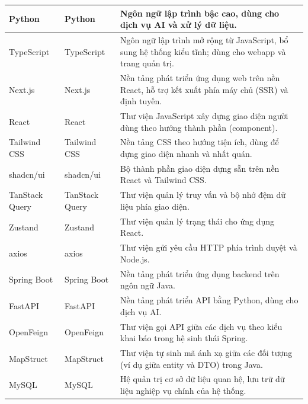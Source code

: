 \begin{longtable}{|L{0.18\textwidth}|L{0.27\textwidth}|L{0.49\textwidth}|}
Python & Python & Ngôn ngữ lập trình bậc cao, dùng cho dịch vụ AI và xử lý dữ liệu. \\
\hline

TypeScript & TypeScript & Ngôn ngữ lập trình mở rộng từ JavaScript, bổ sung hệ thống kiểu tĩnh; dùng cho webapp và trang quản trị. \\
\hline

Next.js & Next.js & Nền tảng phát triển ứng dụng web trên nền React, hỗ trợ kết xuất phía máy chủ (SSR) và định tuyến. \\
\hline

React & React & Thư viện JavaScript xây dựng giao diện người dùng theo hướng thành phần (component). \\
\hline

Tailwind CSS & Tailwind CSS & Nền tảng CSS theo hướng tiện ích, dùng để dựng giao diện nhanh và nhất quán. \\
\hline

shadcn/ui & shadcn/ui & Bộ thành phần giao diện dựng sẵn trên nền React và Tailwind CSS. \\
\hline

TanStack Query & TanStack Query & Thư viện quản lý truy vấn và bộ nhớ đệm dữ liệu phía giao diện. \\
\hline

Zustand & Zustand & Thư viện quản lý trạng thái cho ứng dụng React. \\
\hline

axios & axios & Thư viện gửi yêu cầu HTTP phía trình duyệt và Node.js. \\
\hline

Spring Boot & Spring Boot & Nền tảng phát triển ứng dụng backend trên ngôn ngữ Java. \\
\hline

FastAPI & FastAPI & Nền tảng phát triển API bằng Python, dùng cho dịch vụ AI. \\
\hline

OpenFeign & OpenFeign & Thư viện gọi API giữa các dịch vụ theo kiểu khai báo trong hệ sinh thái Spring. \\
\hline

MapStruct & MapStruct & Thư viện tự sinh mã ánh xạ giữa các đối tượng (ví dụ giữa entity và DTO) trong Java. \\
\hline

MySQL & MySQL & Hệ quản trị cơ sở dữ liệu quan hệ, lưu trữ dữ liệu nghiệp vụ chính của hệ thống. \\
\hline


\end{longtable}
